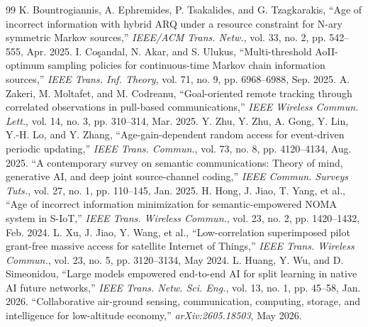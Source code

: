 \documentclass[journal]{IEEEtran}
\begin{document}
\begin{thebibliography}{99}
 K. Bountrogiannis, A. Ephremides, P. Tsakalides, and G. Tzagkarakis, ``Age of incorrect information with hybrid ARQ under a resource constraint for N-ary symmetric Markov sources,'' \emph{IEEE/ACM Trans. Netw.}, vol. 33, no. 2, pp. 542--555, Apr. 2025.
 I. Co\c{s}andal, N. Akar, and S. Ulukus, ``Multi-threshold AoII-optimum sampling policies for continuous-time Markov chain information sources,'' \emph{IEEE Trans. Inf. Theory}, vol. 71, no. 9, pp. 6968--6988, Sep. 2025.
 A. Zakeri, M. Moltafet, and M. Codreanu, ``Goal-oriented remote tracking through correlated observations in pull-based communications,'' \emph{IEEE Wireless Commun. Lett.}, vol. 14, no. 3, pp. 310--314, Mar. 2025.
 Y. Zhu, Y. Zhu, A. Gong, Y. Lin, Y.-H. Lo, and Y. Zhang, ``Age-gain-dependent random access for event-driven periodic updating,'' \emph{IEEE Trans. Commun.}, vol. 73, no. 8, pp. 4120--4134, Aug. 2025.
 ``A contemporary survey on semantic communications: Theory of mind, generative AI, and deep joint source-channel coding,'' \emph{IEEE Commun. Surveys Tuts.}, vol. 27, no. 1, pp. 110--145, Jan. 2025.
 H. Hong, J. Jiao, T. Yang, et al., ``Age of incorrect information minimization for semantic-empowered NOMA system in S-IoT,'' \emph{IEEE Trans. Wireless Commun.}, vol. 23, no. 2, pp. 1420--1432, Feb. 2024.
 L. Xu, J. Jiao, Y. Wang, et al., ``Low-correlation superimposed pilot grant-free massive access for satellite Internet of Things,'' \emph{IEEE Trans. Wireless Commun.}, vol. 23, no. 5, pp. 3120--3134, May 2024.
 L. Huang, Y. Wu, and D. Simeonidou, ``Large models empowered end-to-end AI for split learning in native AI future networks,'' \emph{IEEE Trans. Netw. Sci. Eng.}, vol. 13, no. 1, pp. 45--58, Jan. 2026.
 ``Collaborative air-ground sensing, communication, computing, storage, and intelligence for low-altitude economy,'' \emph{arXiv:2605.18503}, May 2026.


\end{thebibliography}
\end{document}
